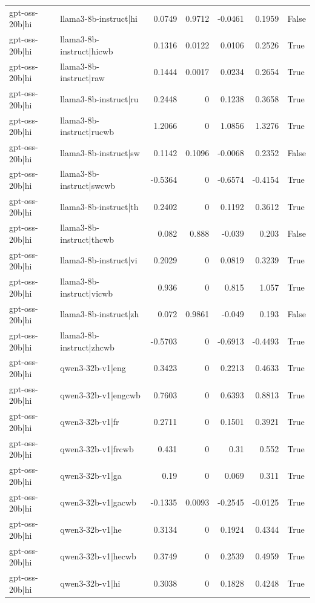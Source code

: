 \begin{table}
\begin{tabular}{l l r r r r l}
gpt-oss-20b|hi & llama3-8b-instruct|hi & 0.0749 & 0.9712 & -0.0461 & 0.1959 & False \\
gpt-oss-20b|hi & llama3-8b-instruct|hicwb & 0.1316 & 0.0122 & 0.0106 & 0.2526 & True \\
gpt-oss-20b|hi & llama3-8b-instruct|raw & 0.1444 & 0.0017 & 0.0234 & 0.2654 & True \\
gpt-oss-20b|hi & llama3-8b-instruct|ru & 0.2448 & 0 & 0.1238 & 0.3658 & True \\
gpt-oss-20b|hi & llama3-8b-instruct|rucwb & 1.2066 & 0 & 1.0856 & 1.3276 & True \\
gpt-oss-20b|hi & llama3-8b-instruct|sw & 0.1142 & 0.1096 & -0.0068 & 0.2352 & False \\
gpt-oss-20b|hi & llama3-8b-instruct|swcwb & -0.5364 & 0 & -0.6574 & -0.4154 & True \\
gpt-oss-20b|hi & llama3-8b-instruct|th & 0.2402 & 0 & 0.1192 & 0.3612 & True \\
gpt-oss-20b|hi & llama3-8b-instruct|thcwb & 0.082 & 0.888 & -0.039 & 0.203 & False \\
gpt-oss-20b|hi & llama3-8b-instruct|vi & 0.2029 & 0 & 0.0819 & 0.3239 & True \\
gpt-oss-20b|hi & llama3-8b-instruct|vicwb & 0.936 & 0 & 0.815 & 1.057 & True \\
gpt-oss-20b|hi & llama3-8b-instruct|zh & 0.072 & 0.9861 & -0.049 & 0.193 & False \\
gpt-oss-20b|hi & llama3-8b-instruct|zhcwb & -0.5703 & 0 & -0.6913 & -0.4493 & True \\
gpt-oss-20b|hi & qwen3-32b-v1|eng & 0.3423 & 0 & 0.2213 & 0.4633 & True \\
gpt-oss-20b|hi & qwen3-32b-v1|engcwb & 0.7603 & 0 & 0.6393 & 0.8813 & True \\
gpt-oss-20b|hi & qwen3-32b-v1|fr & 0.2711 & 0 & 0.1501 & 0.3921 & True \\
gpt-oss-20b|hi & qwen3-32b-v1|frcwb & 0.431 & 0 & 0.31 & 0.552 & True \\
gpt-oss-20b|hi & qwen3-32b-v1|ga & 0.19 & 0 & 0.069 & 0.311 & True \\
gpt-oss-20b|hi & qwen3-32b-v1|gacwb & -0.1335 & 0.0093 & -0.2545 & -0.0125 & True \\
gpt-oss-20b|hi & qwen3-32b-v1|he & 0.3134 & 0 & 0.1924 & 0.4344 & True \\
gpt-oss-20b|hi & qwen3-32b-v1|hecwb & 0.3749 & 0 & 0.2539 & 0.4959 & True \\
gpt-oss-20b|hi & qwen3-32b-v1|hi & 0.3038 & 0 & 0.1828 & 0.4248 & True \\

\end{tabular}
\end{table}
